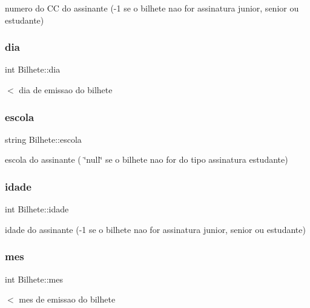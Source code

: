 numero do CC do assinante (-\/1 se o bilhete nao for assinatura junior, senior ou estudante) \mbox{\label{class_bilhete_ad3dbd72118947c8ebb9d2a1a9e6bc3eb}} 
\subsubsection{\texorpdfstring{dia}{dia}}
{\footnotesize\ttfamily int Bilhete\+::dia\hspace{0.3cm}{\ttfamily [protected]}}

$<$ dia de emissao do bilhete \mbox{\label{class_bilhete_a5129f08ea3f4b9ec1c77be2b5377c32f}} 
\subsubsection{\texorpdfstring{escola}{escola}}
{\footnotesize\ttfamily string Bilhete\+::escola\hspace{0.3cm}{\ttfamily [protected]}}

escola do assinante ( \char`\"{}null\char`\"{} se o bilhete nao for do tipo assinatura estudante) \mbox{\label{class_bilhete_a5cd410905c9eeb3e0281df97ddc6b69a}} 
\subsubsection{\texorpdfstring{idade}{idade}}
{\footnotesize\ttfamily int Bilhete\+::idade\hspace{0.3cm}{\ttfamily [protected]}}

idade do assinante (-\/1 se o bilhete nao for assinatura junior, senior ou estudante) \mbox{\label{class_bilhete_ad654ce2fb56eca0738e6994774bb9d75}} 
\subsubsection{\texorpdfstring{mes}{mes}}
{\footnotesize\ttfamily int Bilhete\+::mes\hspace{0.3cm}{\ttfamily [protected]}}

$<$ mes de emissao do bilhete \mbox{\label{class_bilhete_a6c473f8854c6980af895803cfe742279}} 
